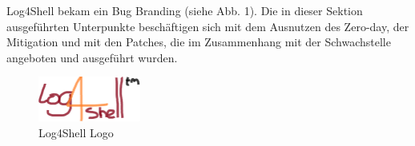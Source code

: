 
Log4Shell bekam ein Bug Branding (siehe Abb. 1). Die in dieser Sektion ausgeführten Unterpunkte beschäftigen
sich mit dem Ausnutzen des Zero-day, der Mitigation und mit den Patches, die im Zusammenhang mit der Schwachstelle angeboten
und ausgeführt wurden.
\begin{figure}[!htb]
    \begin{center}
        \includegraphics[width=0.3\textwidth]{images/log4shell-logo}
    \end{center}
    \caption{Log4Shell Logo}
\end{figure}

